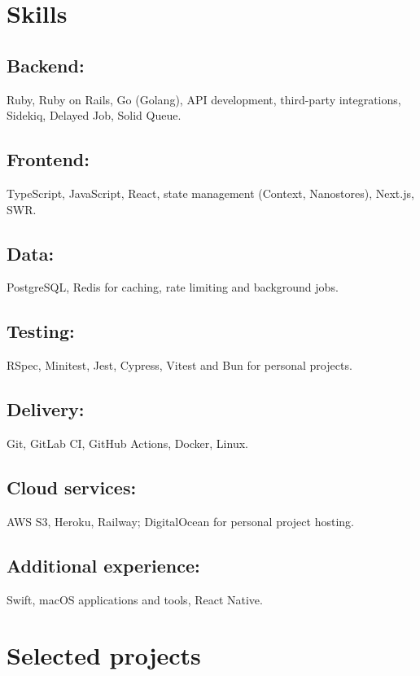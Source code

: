 \section{Skills}
\subsection{Backend:} Ruby, Ruby on Rails, Go (Golang), API development, third-party integrations, Sidekiq, Delayed Job, Solid Queue.

\subsection{Frontend:} TypeScript, JavaScript, React, state management (Context, Nanostores), Next.js, SWR.

\subsection{Data:} PostgreSQL, Redis for caching, rate limiting and background jobs.

\subsection{Testing:} RSpec, Minitest, Jest, Cypress, Vitest and Bun for personal projects.

\subsection{Delivery:} Git, GitLab CI, GitHub Actions, Docker, Linux.

\subsection{Cloud services:} AWS S3, Heroku, Railway; DigitalOcean for personal project hosting.

\subsection{Additional experience:} Swift, macOS applications and tools, React Native.

\section{Selected projects}
